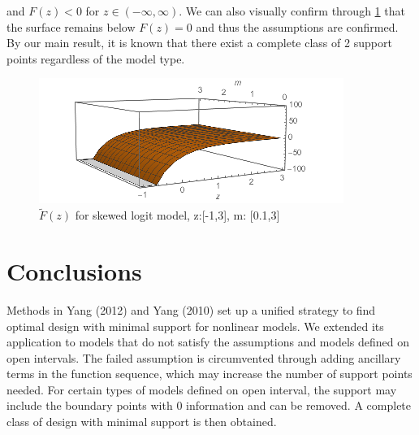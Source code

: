 \documentclass[11pt]{amsart}
\theoremstyle{definition}
\theoremstyle{remark}
\begin{document}
     and $F(z)<0$ for $z\in (-\infty,\infty)$. We can also visually confirm through \ref{fig:skewedlogit_after} that the surface remains below $F(z)=0$ and thus the assumptions are confirmed. By our main result, it is known that there exist a complete class of 2 support points regardless of the model type. \begin{figure}[h]
    \centering
    \includegraphics[scale = 0.8]{skewedlogit_after.png}
    \caption{$\tilde{F}(z)$ for skewed logit model, z:[-1,3], m: [0.1,3]}
    \label{fig:skewedlogit_after}
\end{figure}


\section{Conclusions}
Methods in Yang (2012) and Yang (2010) set up a unified strategy to find optimal design with minimal support for nonlinear models.  We extended its application to models that do not satisfy the assumptions and models defined on open intervals. The failed assumption is circumvented through adding ancillary terms in the function sequence, which may increase the number of support points needed. For certain types of models defined on open interval, the support may include the boundary points with 0 information and can be removed. A complete class of design with minimal support is then obtained. 

 
\end{document}
